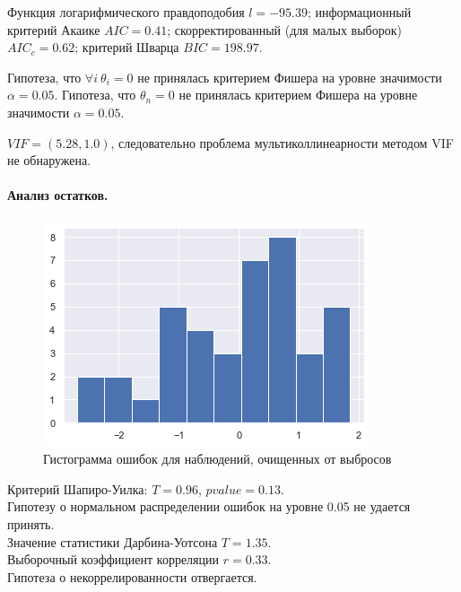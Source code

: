 \documentclass[a4paper,12pt]{article}
\begin{document}
Функция логарифмического правдоподобия $l = -95.39$; информационный критерий Акаике $AIC = 0.41$; скорректированный (для малых выборок) $AIC_c = 0.62$; критерий Шварца $BIC = 198.97$.

Гипотеза, что $\forall i~\theta_i=0$ не принялась критерием Фишера на уровне значимости $\alpha = 0.05$.
Гипотеза, что $\theta_n = 0$ не принялась критерием Фишера на уровне значимости $\alpha = 0.05$.

$VIF = (5.28, 1.0)$, следовательно проблема мультиколлинеарности методом VIF не обнаружена.


\paragraph{Анализ остатков.\\}
\begin{figure}
    \vspace{-2ex}
    \includegraphics[width=\linewidth]{src/img/гистограмма_ошибок_без_выбросов.png}
    \caption{Гистограмма ошибок для наблюдений, очищенных от выбросов}
\end{figure}

Критерий Шапиро-Уилка: $T = 0.96$, $pvalue = 0.13$.\\
Гипотезу о нормальном распределении ошибок на уровне 0.05 не удается принять.\\

Значение статистики Дарбина-Уотсона $T = 1.35$.\\
Выборочный коэффициент корреляции $r = 0.33$.\\
Гипотеза о некоррелированности отвергается.\\
\end{document}
